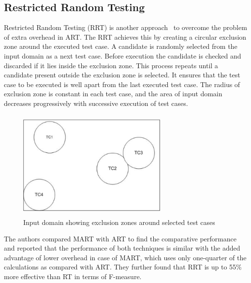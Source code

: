 \subsection{Restricted Random Testing}
Restricted Random Testing (RRT) is another approach~\cite{chan2003normalized} to overcome the problem of extra overhead in ART. The RRT achieves this by creating a circular exclusion zone around the executed test case. A candidate is randomly selected from the input domain as a next test case. Before execution the candidate is checked and discarded if it lies inside the exclusion zone. This process repeats until a candidate present outside the exclusion zone is selected. It ensures that the test case to be executed is well apart from the last executed test case. The radius of exclusion zone is constant in each test case, and the area of input domain decreases progressively with successive execution of test cases.
\bigskip
\bigskip
\begin{figure}[h]
	\centering
	\includegraphics[width= 7.5cm, height = 5.5cm]{chapter2/RRT.pdf}
	\bigskip
	\caption{Input domain showing exclusion zones around selected test cases}
\end{figure}
\bigskip

The authors compared MART with ART to find the comparative performance and reported that the performance of both techniques is similar with the added advantage of lower overhead in case of MART, which uses only one-quarter of the calculations as compared with ART. %
They further found that RRT is up to 55\% more effective than RT in terms of F-measure.




